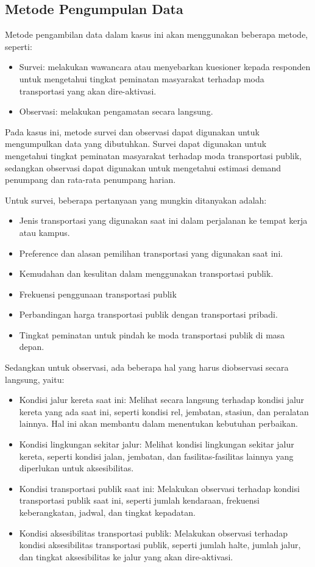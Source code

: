 \documentclass{article}
\begin{document}
\subsection{Metode Pengumpulan Data}

Metode pengambilan data dalam kasus ini akan menggunakan beberapa metode, seperti:
\begin{itemize}
    \item Survei: melakukan wawancara atau menyebarkan kuesioner kepada responden untuk mengetahui tingkat peminatan masyarakat terhadap moda transportasi yang akan dire-aktivasi.
    \item Observasi: melakukan pengamatan secara langsung.
\end{itemize}

Pada kasus ini, metode survei dan observasi dapat digunakan untuk mengumpulkan data yang dibutuhkan. Survei dapat digunakan untuk mengetahui tingkat peminatan masyarakat terhadap moda transportasi publik, sedangkan observasi dapat digunakan untuk mengetahui estimasi demand penumpang dan rata-rata penumpang harian.

Untuk survei, beberapa pertanyaan yang mungkin ditanyakan adalah:
\begin{itemize}
    \item Jenis transportasi yang digunakan saat ini dalam perjalanan ke tempat kerja atau kampus.
    \item Preference dan alasan pemilihan transportasi yang digunakan saat ini.
    \item Kemudahan dan kesulitan dalam menggunakan transportasi publik.
    \item Frekuensi penggunaan transportasi publik
    \item Perbandingan harga transportasi publik dengan transportasi pribadi.
    \item Tingkat peminatan untuk pindah ke moda transportasi publik di masa depan.
\end{itemize}

Sedangkan untuk observasi, ada beberapa hal yang harus diobservasi secara langsung, yaitu:
\begin{itemize}
    \item Kondisi jalur kereta saat ini: Melihat secara langsung terhadap kondisi jalur kereta yang ada saat ini, seperti kondisi rel, jembatan, stasiun, dan peralatan lainnya. Hal ini akan membantu dalam menentukan kebutuhan perbaikan.
    \item Kondisi lingkungan sekitar jalur: Melihat kondisi lingkungan sekitar jalur kereta, seperti kondisi jalan, jembatan, dan fasilitas-fasilitas lainnya yang diperlukan untuk aksesibilitas.
    \item Kondisi transportasi publik saat ini: Melakukan observasi terhadap kondisi transportasi publik saat ini, seperti jumlah kendaraan, frekuensi keberangkatan, jadwal, dan tingkat kepadatan.
    \item Kondisi aksesibilitas transportasi publik: Melakukan observasi terhadap kondisi aksesibilitas transportasi publik, seperti jumlah halte, jumlah jalur, dan tingkat aksesibilitas ke jalur yang akan dire-aktivasi.
\end{itemize}
\end{document}
